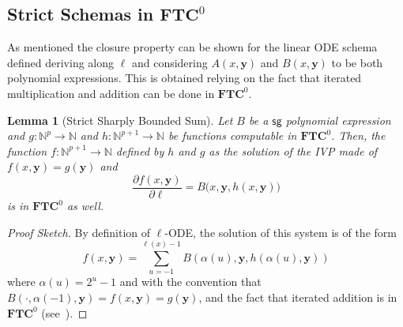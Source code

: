 \documentclass[11pt, oneside]{article}
\newenvironment{toappendix}{}{}
\newcommand{\fun}[1]{\mathsf{#1}}
\newcommand{\sB}{B}
\newcommand{\sA}{A}
\newcommand{\Nat}{\mathbb{N}}
\newcommand{\TC}{\mathbf{FTC}}
\newcommand{\tu}[1]{\mathbf{#1}}
\newtheorem{lemma}{Lemma}
\theoremstyle{definition}
\newtheorem{example}{Example}
\newcommand{\pODE}{\ell\text{-pODE}}
\begin{document}
\begin{toappendix} 
\subsection{Strict Schemas in $\TC^0$}\label{appendix:strictTC}
As mentioned the closure property can be shown for the linear ODE schema defined deriving along $\ell$ and considering $\sA(x, \tu y)$ and $\sB (x, \tu y)$ to be both polynomial expressions.
%
This is obtained relying on the fact that iterated multiplication and addition can be done in $\TC^0$.

\begin{lemma}[Strict Sharply Bounded Sum]\label{lemma:BSum}
    Let $\sB$ be a $\fun{sg}$ polynomial expression and $g:\Nat^p \to \Nat$ and $h: \Nat^{p+1}\to \Nat$ be functions computable in $\TC^0$.
    Then, the function $f:\Nat^{p+1}\to \Nat$ defined by $h$ and $g$ as the solution of the IVP made of $f(x, \tu y) = g(\tu y)$ and
    $$
        \frac{\partial f(x,\tu y)}{\partial \ell} = \sB(x, \tu y, h(x, \tu y)\big)
    $$
    is in $\TC^0$ as well.
\end{lemma}
\begin{proof}[Proof Sketch]
    By definition of $\ell$-ODE, the solution of this system is of the form 
    $$
    f(x, \tu y) = \sum^{\ell(x)-1}_{u=-1} \sB(\alpha(u), \tu y, h(\alpha(u), \tu y))
    $$
    where $\alpha(u)=2^u-1$ and with the convention that $\sB(\cdot, \alpha(-1), \tu y)=f(x, \tu y)=g(\tu y)$, and the fact that iterated addition is in $\TC^0$ (see~\cite{Vollmer}). 
\end{proof}









\end{toappendix}
\end{document}
